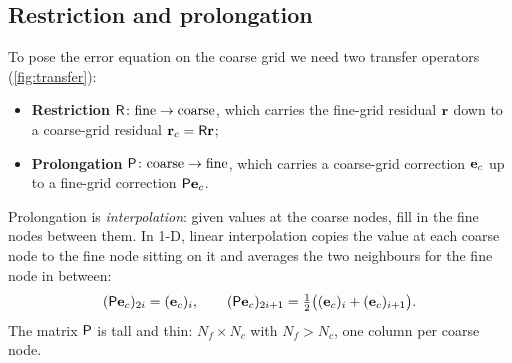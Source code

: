 \subsection{Restriction and prolongation}

To pose the error equation on the coarse grid we need two transfer operators
(\cref{fig:transfer}):
\begin{itemize}[nosep]
\item \textbf{Restriction} $\mathsf{R}\colon \text{fine}\to\text{coarse}$, which carries the
  fine-grid residual $\mathbf{r}$ down to a coarse-grid residual $\mathbf{r}_c = \mathsf{R}\mathbf{r}$;
\item \textbf{Prolongation} $\mathsf{P}\colon \text{coarse}\to\text{fine}$, which carries a
  coarse-grid correction $\mathbf{e}_c$ up to a fine-grid correction $\mathsf{P}\mathbf{e}_c$.
\end{itemize}
Prolongation is \emph{interpolation}: given values at the coarse nodes, fill in the fine
nodes between them. In 1-D, linear interpolation copies the value at each coarse node to
the fine node sitting on it and averages the two neighbours for the fine node in between:
\[
  (\mathsf{P}\mathbf{e}_c)_{2i} = (\mathbf{e}_c)_i, \qquad
  (\mathsf{P}\mathbf{e}_c)_{2i+1} = \tfrac12\bigl((\mathbf{e}_c)_i + (\mathbf{e}_c)_{i+1}\bigr).
\]
The matrix $\mathsf{P}$ is tall and thin: $N_f \times N_c$ with $N_f > N_c$, one column per
coarse node.

